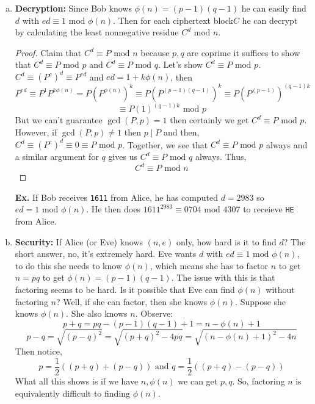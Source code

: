 \documentclass[class=article, crop=false]{standalone}
\begin{document}
\begin{enumerate}[1.]
\begin{enumerate}[(a)]
		\item \textbf{Decryption:}
		Since Bob knows $\phi(n)=(p-1)(q-1)$ he can easily find $d$ with $ed\equiv 1\mbox{ mod }\phi(n)$.
		Then for each ciphertext block$C$ he can decrypt by calculating the least nonnegative residue $C^d\mbox{ mod } n$.
		\begin{proof}
			Claim that $C^d \equiv P\mbox{ mod }n$ because $p,q$ are coprime it suffices to show that
			$C^d\equiv P \mbox{ mod }p$ and $C^d\equiv P\mbox{ mod }q$. Let's show $C^d \equiv P\mbox{ mod }p$.
			$C^d \equiv (P^e)^d \equiv P^{ed}$ and $ed=1+k\phi(n)$, then 
			$$P^{ed}\equiv P^{1}P^{k\phi(n)}= P(P^{\phi(n)})^k \equiv P(P^{(p-1)(q-1)})^k \equiv P(P^{(p-1)})^{(q-1)k}$$
			$$\equiv P(1)^{(q-1)k} \mbox{ mod }p$$
			But we can't guarantee $\gcd(P,p)=1$ then certainly we get $C^d\equiv P\mbox{ mod }p$.
			However, if $\gcd(P,p)\neq 1$ then $p\mid P$ and then, $C^d\equiv (P^e)^d\equiv 0\equiv P\mbox{ mod }p$.
			Together, we see that $C^d\equiv P\mbox{ mod }p$ always and a similar argument for $q$ gives us $C^d\equiv P\mbox{ mod }q$ always.
			Thus, $$C^d\equiv P\mbox{ mod }n$$
		\end{proof}
		\noindent\textbf{Ex.} If Bob receives \verb|1611| from Alice, he has computed $d=2983$ so $ed=1\mbox{ mod }\phi(n)$.
		He then does $1611^{2983}\equiv 0704\mbox{ mod }4307$ to receieve \verb|HE| from Alice.

		\item \textbf{Security:} If Alice (or Eve) knows $(n,e)$ only, how hard is it to find $d$? The short answer,
		no, it's extremely hard. Eve wants $d$ with $ed\equiv 1\mbox{ mod }\phi(n)$, to do this she needs to know
		$\phi(n)$, which means she has to factor $n$ to get $n=pq$ to get $\phi(n) = (p-1)(q-1)$.
		The issue with this is that factoring seems to be hard. 
		Is it possible that Eve can find $\phi(n)$ without factoring $n$? Well,
		if she can factor, then she knows $\phi(n)$. Suppose she knows $\phi(n)$.
		She also knows $n$. Observe:
		$$p+q=pq-(p-1)(q-1)+1=n-\phi(n)+1$$
		$$p-q=\sqrt{(p-q)^2}=\sqrt{(p+q)^2-4pq}=\sqrt{(n-\phi(n)+1)^2-4n}$$
		Then notice,
		$$p=\frac{1}{2}((p+q)+(p-q)) \text{ and }q=\frac{1}{2}((p+q)-(p-q))$$
		What all this shows is if we have $n,\phi(n)$ we can get $p,q$. So, factoring $n$
		is equivalently difficult to finding $\phi(n)$.


\end{enumerate}
\end{enumerate}
\end{document}
